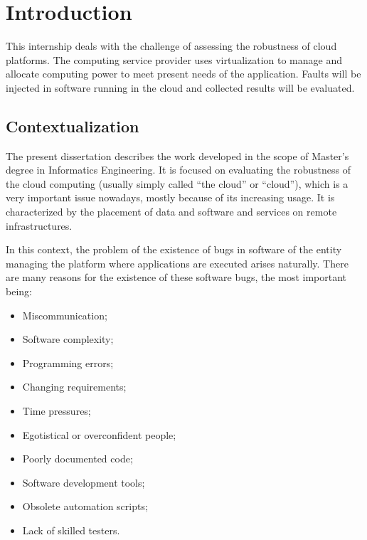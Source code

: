 \clearpage
\section{Introduction}

This internship deals with the challenge of assessing the robustness of cloud platforms. The computing service provider uses virtualization to manage and allocate computing power to meet present needs of the application.
Faults will be injected in software running in the cloud and collected results will be evaluated.

\subsection{Contextualization}


The present dissertation describes the work developed in the scope of Master's degree in Informatics Engineering. It is focused on evaluating the robustness of the cloud computing (usually simply called ``the cloud'' or ``cloud''), which is a very important issue nowadays, mostly because of its increasing usage.
It is characterized by the placement of data and software and services on remote infrastructures. 

In this context, the problem of the existence of bugs in software of the entity managing the platform where applications are executed arises naturally. There are many reasons for the existence of these software bugs, the most important being:

\begin{itemize}
	\item Miscommunication;
	\item Software complexity;
	\item Programming errors;
	\item Changing requirements;
	\item Time pressures;
	\item Egotistical or overconfident people;
	\item Poorly documented code;
	\item Software development tools;
	\item Obsolete automation scripts;
	\item Lack of skilled testers.
\end{itemize}

